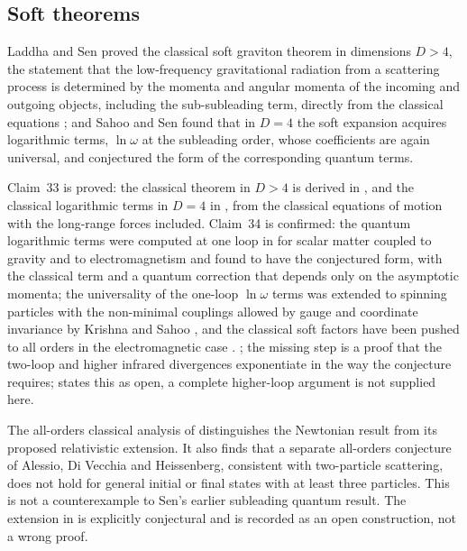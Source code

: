 \subsection{Soft theorems}\label{ssec:soft}

Laddha and Sen \cite{LaddhaSen19} proved the classical soft graviton theorem in dimensions $D>4$, the statement that the low-frequency gravitational radiation from a scattering process is determined by the momenta and angular momenta of the incoming and outgoing objects, including the sub-subleading term, directly from the classical equations \cite{Sen18subsub}; and Sahoo and Sen \cite{SahooSen19} found that in $D=4$ the soft expansion acquires logarithmic terms, $\ln\omega$ at the subleading order, whose coefficients are again universal, and conjectured the form of the corresponding quantum terms.

\begin{verdict}[claims 33, 34]
Claim~33 is proved: the classical theorem in $D>4$ is derived in \cite{LaddhaSen19}, and the classical logarithmic terms in $D=4$ in \cite{SahooSen19}, from the classical equations of motion with the long-range forces included. Claim~34 is confirmed: the quantum logarithmic terms were computed at one loop in \cite{SahooSen19} for scalar matter coupled to gravity and to electromagnetism and found to have the conjectured form, with the classical term and a quantum correction that depends only on the asymptotic momenta; the universality of the one-loop $\ln\omega$ terms was extended to spinning particles with the non-minimal couplings allowed by gauge and coordinate invariance by Krishna and Sahoo \cite{KrishnaSahoo23}, and the classical soft factors have been pushed to all orders in the electromagnetic case \cite{KKSS25}. ; the missing step is a proof that the two-loop and higher infrared divergences exponentiate in the way the conjecture requires; \cite{KrishnaSahoo23} states this as open, a complete higher-loop argument is not supplied here.
\end{verdict}

 The all-orders classical analysis of \cite{KKMSS26} distinguishes the Newtonian result from its proposed relativistic extension. It also finds that a separate all-orders conjecture of Alessio, Di Vecchia and Heissenberg, consistent with two-particle scattering, does not hold for general initial or final states with at least three particles. This is not a counterexample to Sen's earlier subleading quantum result. The extension in \cite{KKMSS26} is explicitly conjectural and is recorded as an open construction, not a wrong proof.

